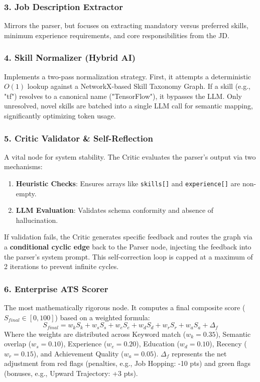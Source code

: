 \subsubsection{3. Job Description Extractor}
Mirrors the parser, but focuses on extracting mandatory versus preferred skills, minimum experience requirements, and core responsibilities from the JD.

\subsubsection{4. Skill Normalizer (Hybrid AI)}
Implements a two-pass normalization strategy. First, it attempts a deterministic $O(1)$ lookup against a NetworkX-based Skill Taxonomy Graph. If a skill (e.g., "tf") resolves to a canonical name ("TensorFlow"), it bypasses the LLM. Only unresolved, novel skills are batched into a single LLM call for semantic mapping, significantly optimizing token usage.

\subsubsection{5. Critic Validator \& Self-Reflection}
A vital node for system stability. The Critic evaluates the parser's output via two mechanisms:
\begin{enumerate}
    \item \textbf{Heuristic Checks}: Ensures arrays like \texttt{skills[]} and \texttt{experience[]} are non-empty.
    \item \textbf{LLM Evaluation}: Validates schema conformity and absence of hallucination.
\end{enumerate}
If validation fails, the Critic generates specific feedback and routes the graph via a \textbf{conditional cyclic edge} back to the Parser node, injecting the feedback into the parser's system prompt. This self-correction loop is capped at a maximum of 2 iterations to prevent infinite cycles.

\subsubsection{6. Enterprise ATS Scorer}
The most mathematically rigorous node. It computes a final composite score ($S_{final} \in [0, 100]$) based on a weighted formula:
\begin{equation}
    S_{final} = w_k S_k + w_s S_s + w_e S_e + w_d S_d + w_r S_r + w_a S_a + \Delta_f
\end{equation}
Where the weights are distributed across Keyword match ($w_k = 0.35$), Semantic overlap ($w_s = 0.10$), Experience ($w_e = 0.20$), Education ($w_d = 0.10$), Recency ($w_r = 0.15$), and Achievement Quality ($w_a = 0.05$). $\Delta_f$ represents the net adjustment from red flags (penalties, e.g., Job Hopping: -10 pts) and green flags (bonuses, e.g., Upward Trajectory: +3 pts).

